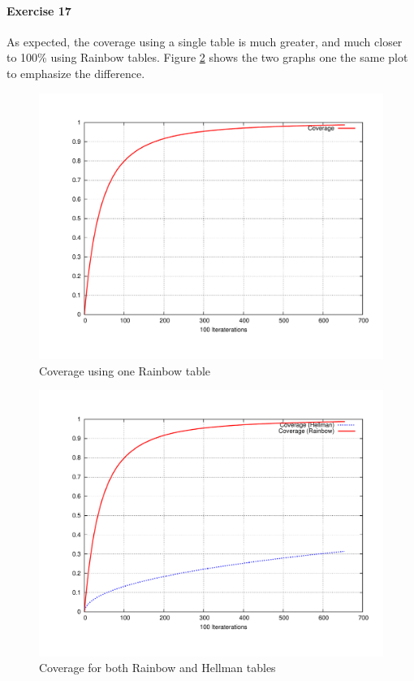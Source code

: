\documentclass[10pt,a4paper]{article}
\begin{document}
\paragraph*{Exercise 17} As expected, the coverage using a single table is much greater, and much closer to 100\% using Rainbow tables. Figure \ref{fig:ex17a} shows the two graphs one the same plot to emphasize the difference.
\begin{figure}[h]
\centering
\includegraphics[scale=0.4]{../output/ex17.pdf}
 \caption{Coverage using one Rainbow table}
 \label{fig:ex17}
\end{figure}

\begin{figure}[h]
\centering
\includegraphics[scale=0.4]{../output/ex17a.pdf}
 \caption{Coverage for both Rainbow and Hellman tables}
 \label{fig:ex17a}
\end{figure}
\end{document}
